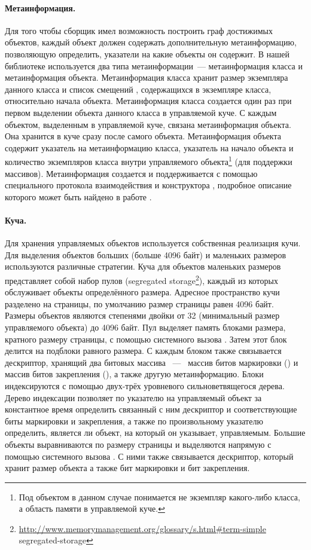\paragraph{Метаинформация.}
Для того чтобы сборщик имел возможность построить граф достижимых объектов, каждый объект 
должен содержать дополнительную метаинформацию, позволяющую определить, указатели на какие 
объекты он содержит. 
В нашей библиотеке используется два типа метаинформации~--- метаинформация класса и 
метаинформация объекта. 
Метаинформация класса хранит размер экземпляра данного класса и список смещений , 
содержащихся в экземпляре класса, относительно начала объекта. 
Метаинформация класса создается один раз при первом выделении объекта данного класса в 
управляемой куче. 
С каждым объектом, выделенным в управляемой куче, связана метаинформация объекта. 
Она хранится в куче сразу после самого объекта. 
Метаинформация объекта содержит указатель на метаинформацию класса, указатель на начало 
объекта и количество экземпляров класса внутри управляемого 
объекта\footnote{Под объектом в данном случае понимается не экземпляр какого-либо класса, 
а область памяти в управляемой куче.} (для поддержки массивов). 
Метаинформация создается и поддерживается с помощью специального протокола взаимодействия 
 и конструктора , подробное описание которого может быть найдено 
в работе \cite{book:precisegc_secr}.

\paragraph{Куча.}
\label{sec:heap}
Для хранения управляемых объектов используется собственная реализация кучи. 
Для выделения объектов больших (больше 4096 байт) и маленьких размеров используются 
различные стратегии. 
Куча для объектов маленьких размеров представляет собой набор пулов 
(segregated storage\footnote{\url{http://www.memorymanagement.org/glossary/s.html\#term-simple}\\
{segregated-storage}}), 
каждый из которых обслуживает объекты определённого размера. 
Адресное пространство кучи разделено на страницы, по умолчанию размер страницы равен 4096 байт. 
Размеры объектов являются степенями двойки от 32 (минимальный размер управляемого объекта) до 
4096 байт. 
Пул выделяет память блоками размера, кратного размеру страницы, с помощью системного вызова 
. 
Затем этот блок делится на подблоки равного размера. 
С каждым блоком также связывается дескриптор, хранящий два битовых массива ~---~ 
массив битов маркировки () и массив битов закрепления (), 
а также другую метаинформацию. 
Блоки индексируются с помощью двух-трёх уровневого сильноветвящегося дерева. 
Дерево индексации позволяет по указателю на управляемый объект за константное время 
определить связанный с ним дескриптор и соответствующие биты маркировки и закрепления, 
а также по произвольному указателю определить, является ли объект, на который он указывает, 
управляемым. 
Большие объекты выравниваются по размеру страницы и выделяются напрямую с помощью системного 
вызова . 
С ними также связывается дескриптор, который хранит размер объекта а также бит маркировки и 
бит закрепления.

